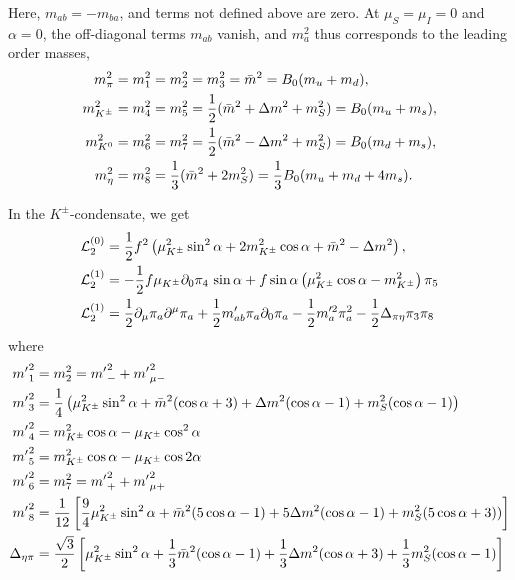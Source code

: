 %
Here, $m_{ab} = -m_{ba}$, and terms not defined above are zero.
At $\mu_S = \mu_I = 0$ and $\alpha = 0$, the off-diagonal terms $m_{ab}$ vanish, and $m_a^2$ thus corresponds to the leading order masses,
%
\begin{align}
    m_\pi^2 & = m_1^2 = m_2^2 = m_3^2 = \bar m^2 = B_0(m_u + m_d), \\
    m_{{K^\pm}}^2 & = m_4^2 = m_5^2 = \frac{1}{2} (\bar m^2 + \Delta m^2 + m_S^2) = B_0(m_u + m_s), \\
    m_{{K^0} }^2 & = m_6^2 = m_7^2 = \frac{1}{2} (\bar m^2 - \Delta m^2 + m_S^2) = B_0(m_d + m_s), \\
    m_\eta^2 & = m_8^2 = \frac{1}{3}(\bar m^2  + 2m_S^2) = \frac{1}{3}B_0(m_u + m_d + 4m_s).
\end{align}
%


In the $K^\pm$-condensate, we get
%
\begin{align}
    \Ell^{(0)}_2 
    & =
    \frac{1}{2}f^2 
    \left(
        \mu_\Kpm^2 \sin^2\alpha
        + 2m^2_\Kpm \cos\alpha
        + \bar m^2 - \Delta m^2
    \right), \\
    \Ell_2^{(1)}
    & 
    =
    - \frac{1}{2}f\mu_\Kpm\partial_0\pi_4 \, \sin\alpha 
    + f\sin\alpha
    
    \left(
        \mu_\Kpm^2 \cos\alpha
        -m_\Kpm^2
    \right)\pi_5\\
    \Ell_2^{(1)}
    & =
    \frac{1}{2} \partial_\mu \pi_a \partial^\mu \pi_a
    + \frac{1}{2}m'_{ab} \pi_a\partial_0\pi_a
    - \frac{1}{2}m'^2_{a} \pi_a^2
    - \frac{1}{2}\Delta_{\pi\eta} \pi_3\pi_8
\end{align}
%
where
%
\begin{align}
    {m'}_1^2 & = m_2^2 = {m'}_-^2 + {m'}_{\mu-}^2\\
    {m'}_3^2 
    & = 
    \frac{1}{4}
    \left(
        \mu_{K^\pm}^2 \sin^2\alpha
        + \bar m^2(\cos\alpha + 3)
        + \Delta m^2 (\cos\alpha -1)
        + m_S^2(\cos\alpha - 1)
    \right)\\
    {m'}_4^2 & = m_{K^\pm}^2\cos\alpha -\mu_{K^\pm} \cos^2\alpha \\
    {m'}_5^2 & = m_{K^\pm}^2\cos\alpha -\mu_{K^\pm} \cos 2\alpha \\
    {m'}_6^2 & = m_7^2 = {m'}_+^2 + {m'}_{\mu+}^2\\
    {m'}_8^2
    & =
    \frac{1}{12}
    \left[
        \frac{9}{4}\mu_{K^\pm}^2\sin^2\alpha
        + \bar m^2(5\cos\alpha-1) 
        + 5\Delta m^2(\cos\alpha-1)
        + m_S^2(5\cos\alpha+3))
    \right] \\
    \Delta_{\eta\pi}
    & =
    \frac{\sqrt{3}}{2}
    \left[
        \mu_{K^\pm}^2\sin^2\alpha
        + \frac{1}{3}\bar m^2(\cos\alpha - 1)
        + \frac{1}{3}\Delta m^2(\cos\alpha + 3)
        + \frac{1}{3}m^2_S(\cos\alpha - 1)
    \right]
\end{align}
